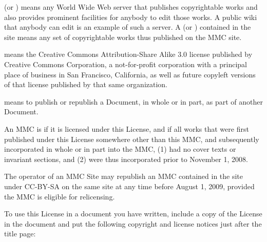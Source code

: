 \stopalignment


 (or ) means any
World Wide Web server that publishes copyrightable works and also
provides prominent facilities for anybody to edit those works.  A
public wiki that anybody can edit is an example of such a server.  A
 (or ) contained in the
site means any set of copyrightable works thus published on the MMC
site.

 means the Creative Commons Attribution-Share Alike 3.0
license published by Creative Commons Corporation, a not-for-profit
corporation with a principal place of business in San Francisco,
California, as well as future copyleft versions of that license
published by that same organization.

 means to publish or republish a Document, in whole or
in part, as part of another Document.

An MMC is  if it is licensed under this
License, and if all works that were first published under this License
somewhere other than this MMC, and subsequently incorporated in whole
or in part into the MMC, (1) had no cover texts or invariant sections,
and (2) were thus incorporated prior to November 1, 2008.

The operator of an MMC Site may republish an MMC contained in the site
under CC-BY-SA on the same site at any time before August 1, 2009,
provided the MMC is eligible for relicensing.


\stopalignment

To use this License in a document you have written, include a copy of
the License in the document and put the following copyright and
license notices just after the title page:

\bigskip
{}
\bigskip

